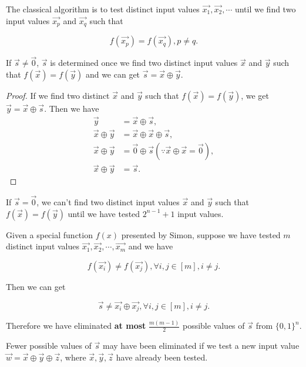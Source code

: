 The classical algorithm is to test distinct input values $\vec{x_1}, \vec{x_2}, \cdots$ until we find two input values $\vec{x_p}$ and $\vec{x_q}$ such that 

$$
f(\vec{x_p}) = f(\vec{x_q}),p \neq q.
$$

\begin{remark}
If $\vec{s} \neq \vec{0}$, $\vec{s}$ is determined once we find two distinct input values $\vec{x}$ and $\vec{y}$ such that $f(\vec{x})=f(\vec{y})$ and we can get $\vec{s} = \vec{x} \oplus \vec{y}$. 
\end{remark}
	\begin{proof}
		If we find two distinct $\vec{x}$ and $\vec{y}$ such that $f(\vec{x}) = f(\vec{y})$,  we get $\vec{y} =\vec{x} \oplus \vec{s}$. Then we have
		$$
		\begin{aligned}
			\vec{y} & =\vec{x} \oplus \vec{s}, \\
			\vec{x} \oplus \vec{y} & =\vec{x} \oplus \vec{x} \oplus \vec{s}, \\
			\vec{x} \oplus \vec{y} & =\vec{0} \oplus \vec{s}(\because \vec{x} \oplus \vec{x}=\vec{0}), \\
			\vec{x} \oplus \vec{y} & =\vec{s}.
		\end{aligned}
		$$
	\end{proof}

\begin{remark}
If $\vec{s} = \vec{0}$, we can't find two distinct input values $\vec{x}$ and $\vec{y}$ such that $f(\vec{x})=f(\vec{y})$ until we have tested $2^{n-1}+1$ input values.
\end{remark}

\begin{mdframed}
Given a special function $f(x)$ presented by Simon, suppose we have tested $m$ distinct input values $\vec{x_1}, \vec{x_2},\cdots, \vec{x_m}$ and we have

$$
f(\vec{x_i}) \neq f(\vec{x_j}), \forall i,j \in [m],i \neq j.
$$ 

Then we can get

$$
\vec{s} \neq \vec{x_i} \oplus \vec{x_j}, \forall i,j \in [m],i \neq j.
$$

Therefore we have eliminated \textbf{at most} $\frac{m(m-1)}{2}$ possible values of $\vec{s}$ from $\{0,1\}^n$.
\end{mdframed}

\begin{remark}
Fewer possible values of $\vec{s}$ may have been eliminated if we test a new input value $\vec{w} = \vec{x} \oplus \vec{y} \oplus \vec{z}$, where $\vec{x}, \vec{y}, \vec{z}$ have already been tested.
\end{remark}

